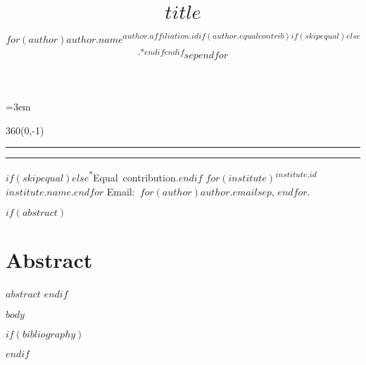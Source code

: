 \documentclass[letterpaper,12pt]{article}
\title{$title$}
\author{$for(author)$\mbox{$author.name$\textsuperscript{$author.affiliation.id$$if(author.equalcontrib)$$if(skipequal)$$else$,*$endif$$endif$}}$sep$\quad $endfor$}
\date{}
\begin{document}
\maketitle

\thispagestyle{fancy}
\parindent=3em
\setnowidow[2]

\newlength{\lmargin}
\setlength{\lmargin}{\dimexpr(\paperwidth-\textwidth)/2\relax}
\textblockorigin{\lmargin}{\paperheight}
\setlength{\TPHorizModule}{1pt}
\setlength{\TPVertModule}{1in}
\begin{textblock}{360}(0,-1)
    \parindent=0pt%
    \normalfont\scriptsize\raggedright%
    \hrule%
    \hrule%
    \vspace{1.5ex}%
    $if(skipequal)$$else$\mbox{\textsuperscript{*}Equal contribution.}\enskip$endif$%
    $for(institute)$\mbox{\textsuperscript{$institute.id$}$institute.name$.}\enskip$endfor$%
    Email:~$for(author)$\mbox{\texttt{$author.email$}}$sep$, $endfor$.%
\end{textblock}

$if(abstract)$
\section*{Abstract}
$abstract$
$endif$

$body$

$if(bibliography)$
\footnotesize


$endif$
\end{document}
